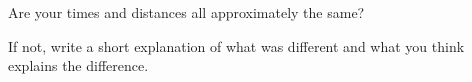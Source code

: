 
Are your times and distances all approximately the same? 

If not, write a short explanation of what was different and 
what you think explains the difference.

\myCenteredBox[colback=\myFillinColor]{
    \vspace{1em}
    \underline{\hspace{\textwidth}}\\[0.5\baselineskip]
    \underline{\hspace{\textwidth}}\\[0.5\baselineskip]
    \underline{\hspace{\textwidth}}\\[0.5\baselineskip]
    \underline{\hspace{\textwidth}}\\[0.5\baselineskip]
    \underline{\hspace{\textwidth}}\\[0.5\baselineskip]
    \underline{\hspace{\textwidth}}\\
}
